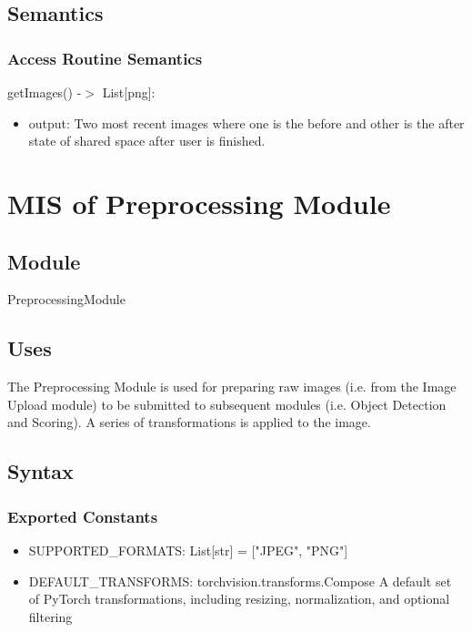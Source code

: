 \documentclass[12pt, titlepage]{article}
\begin{document}
\subsection{Semantics}


\subsubsection{Access Routine Semantics}

\noindent getImages() -$>$ List[png]:
\begin{itemize}
\item output: Two most recent images where one is the before and other is the after state of shared space after user is finished.
\end{itemize}

\newpage

\section{MIS of Preprocessing Module} \label{Module} 

\subsection{Module}

PreprocessingModule

\subsection{Uses}
The Preprocessing Module is used for preparing raw images (i.e. from the Image Upload module) to be submitted to subsequent modules (i.e. Object Detection and Scoring). A series of transformations is applied to the image.

\subsection{Syntax}

\subsubsection{Exported Constants}

\begin{itemize}
  \item SUPPORTED{\_}FORMATS: List[str] = ["JPEG", "PNG"]
  \item DEFAULT{\_}TRANSFORMS: torchvision.transforms.Compose\: A default set of PyTorch transformations, including resizing, normalization, and optional filtering
\end{itemize}
\end{document}
